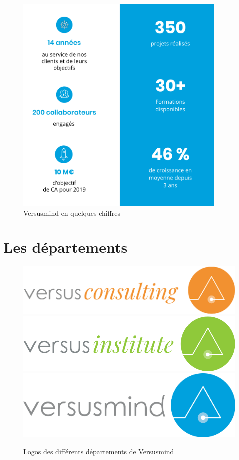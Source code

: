 \documentclass[12pt, a4paper]{report}
\begin{document}
\begin{figure}[H]
    \begin{center}
        \includegraphics[width=0.9\textwidth]{croissance.png}
    \end{center}
    \caption{Versusmind en quelques chiffres}
\end{figure}

\section{Les départements}
\begin{figure}[H]
    \centering
    \includegraphics[width=.45\textwidth]{versusconsulting.png}
    \includegraphics[width=.45\textwidth]{versusinstitute.png}
    \includegraphics[width=.45\textwidth]{versusmind.png}
    \caption{Logos des différents départements de Versusmind}
\end{figure}
\end{document}
